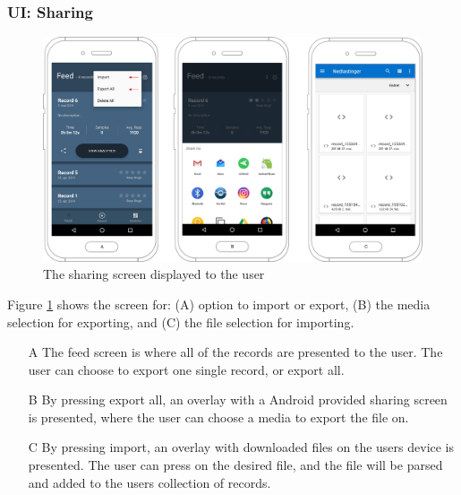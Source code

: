 \subsubsection{UI: Sharing}
\begin{figure}
    \centering
    \includegraphics[scale=0.26]{images/Sharing_img.pdf}
    \caption{The sharing screen displayed to the user}
    \label{fig:screen_sharing}
\end{figure}

Figure \ref{fig:screen_sharing} shows the screen for: (A) option to import or export, (B) the media selection for exporting, and (C) the file selection for importing.

\begin{itemize}
    \item[A] The feed screen is where all of the records are presented to the user. The user can choose to export one single record, or export all. 
    \item[B] By pressing export all, an overlay with a Android provided sharing screen is presented, where the user can choose a media to export the file on. 
    \item[C] By pressing import, an overlay with downloaded files on the users device is presented. The user can press on the desired file, and the file will be parsed and added to the users collection of records.  
\end{itemize}

